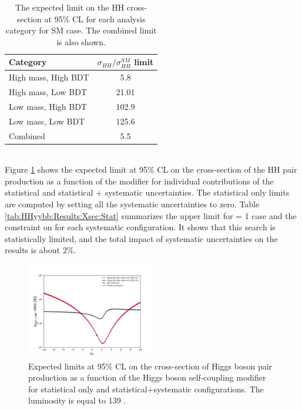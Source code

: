 \begin{table}[htbp]
    \centering
    \begin{tabular}{lc}
        \hline\hline
        Category &  $\sigma_{HH}/\sigma_{HH}^{SM}$ limit \\
        \hline
        High mass, High BDT &  5.8 \\
        High mass, Low BDT &  21.01  \\
        Low mass, High BDT &  102.9 \\
        Low mass, Low BDT  &  125.6 \\
        \hline 
        Combined & 5.5 \\
        \hline\hline
    \end{tabular}
    \begin{tcolorbox}[colback=black!5!white,colframe=white!75!black]
    \caption{The expected limit on the HH cross-section at 95\% CL for each analysis category for SM case. The combined limit is also shown.}
    \label{tab:HHyybb:Results:Xsec:Cat}
    \end{tcolorbox}
\end{table}
\\
Figure \ref{fig:HHyybb:Results:Xsec:statvsSys} shows the expected limit at 95\% CL on the cross-section of the HH pair production as a function of the \kl modifier for individual contributions of the statistical and statistical + systematic uncertainties. The statistical only limits are computed by setting all the systematic uncertainties to zero. Table \ref{tab:HHyybb:Results:Xsec:Stat} summarizes the upper limit for \kl = 1 case and the constraint on \kl for each systematic configuration. It shows that this search is statistically limited, and the total impact of systematic uncertainties on the results is about 2\%.
\begin{figure}[htbp]
    \centering
    \includegraphics[width=0.5\textwidth]{Ch5/Img/kappa_lambda_stat_vs_sys.pdf}
    \begin{tcolorbox}[colback=black!5!white,colframe=white!75!black]
    \caption{Expected limits at 95\% CL on the cross-section of Higgs boson pair production as a function of the Higgs boson self-coupling modifier \kl for statistical only and statistical+systematic configurations. The luminosity is equal to 139 \ifb.}
    \label{fig:HHyybb:Results:Xsec:statvsSys}
    \end{tcolorbox}
\end{figure}
